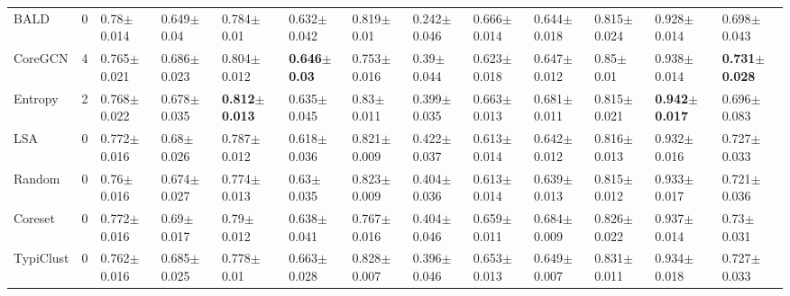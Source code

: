 \documentclass[]{article}
\begin{document}
\begin{table}[H]
{\begin{tabular}{l|clllllllllll}
BALD & 0 & 0.78$\pm${\small0.014} & 0.649$\pm${\small0.04} & 0.784$\pm${\small0.01} & 0.632$\pm${\small0.042} & 0.819$\pm${\small0.01} & 0.242$\pm${\small0.046} & 0.666$\pm${\small0.014} & 0.644$\pm${\small0.018} & 0.815$\pm${\small0.024} & 0.928$\pm${\small0.014} & 0.698$\pm${\small0.043} \\
CoreGCN & 4 & 0.765$\pm${\small0.021} & 0.686$\pm${\small0.023} & 0.804$\pm${\small0.012} & \textbf{0.646$\pm${\small0.03}} & 0.753$\pm${\small0.016} & 0.39$\pm${\small0.044} & 0.623$\pm${\small0.018} & 0.647$\pm${\small0.012} & 0.85$\pm${\small0.01} & 0.938$\pm${\small0.014} & \textbf{0.731$\pm${\small0.028}} \\
Entropy & 2 & 0.768$\pm${\small0.022} & 0.678$\pm${\small0.035} & \textbf{0.812$\pm${\small0.013}} & 0.635$\pm${\small0.045} & 0.83$\pm${\small0.011} & 0.399$\pm${\small0.035} & 0.663$\pm${\small0.013} & 0.681$\pm${\small0.011} & 0.815$\pm${\small0.021} & \textbf{0.942$\pm${\small0.017}} & 0.696$\pm${\small0.083} \\
LSA & 0 & 0.772$\pm${\small0.016} & 0.68$\pm${\small0.026} & 0.787$\pm${\small0.012} & 0.618$\pm${\small0.036} & 0.821$\pm${\small0.009} & 0.422$\pm${\small0.037} & 0.613$\pm${\small0.014} & 0.642$\pm${\small0.012} & 0.816$\pm${\small0.013} & 0.932$\pm${\small0.016} & 0.727$\pm${\small0.033} \\
Random & 0 & 0.76$\pm${\small0.016} & 0.674$\pm${\small0.027} & 0.774$\pm${\small0.013} & 0.63$\pm${\small0.035} & 0.823$\pm${\small0.009} & 0.404$\pm${\small0.036} & 0.613$\pm${\small0.014} & 0.639$\pm${\small0.013} & 0.815$\pm${\small0.012} & 0.933$\pm${\small0.017} & 0.721$\pm${\small0.036} \\
Coreset & 0 & 0.772$\pm${\small0.016} & 0.69$\pm${\small0.017} & 0.79$\pm${\small0.012} & 0.638$\pm${\small0.041} & 0.767$\pm${\small0.016} & 0.404$\pm${\small0.046} & 0.659$\pm${\small0.011} & 0.684$\pm${\small0.009} & 0.826$\pm${\small0.022} & 0.937$\pm${\small0.014} & 0.73$\pm${\small0.031} \\
TypiClust & 0 & 0.762$\pm${\small0.016} & 0.685$\pm${\small0.025} & 0.778$\pm${\small0.01} & 0.663$\pm${\small0.028} & 0.828$\pm${\small0.007} & 0.396$\pm${\small0.046} & 0.653$\pm${\small0.013} & 0.649$\pm${\small0.007} & 0.831$\pm${\small0.011} & 0.934$\pm${\small0.018} & 0.727$\pm${\small0.033}
		\end{tabular}
	}
\end{table}
\end{document}
